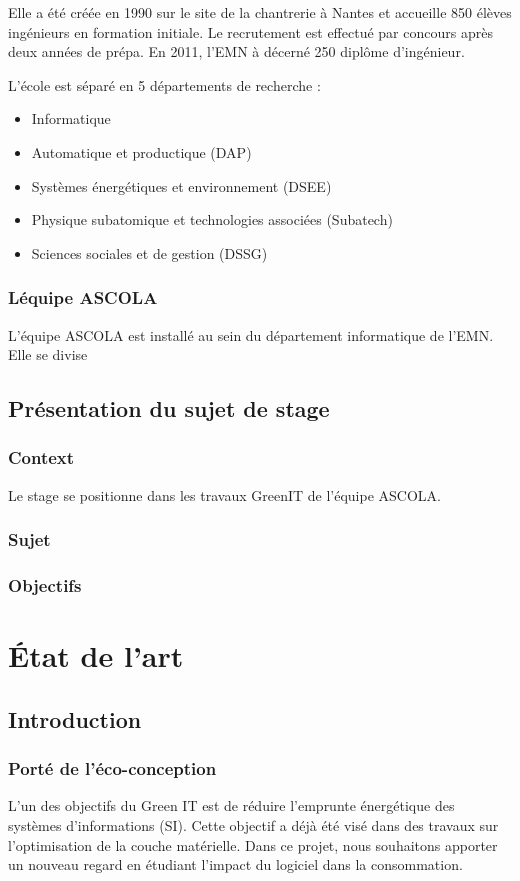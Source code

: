 \documentclass[a4paper, 11pt]{report}
\begin{document}
Elle a été créée en 1990 sur le site de la chantrerie à Nantes et accueille 850 élèves ingénieurs en formation initiale. Le recrutement est effectué par concours après deux années de prépa. En 2011, l’EMN à décerné 250 diplôme d’ingénieur.

L’école est séparé en 5 départements de recherche :
\begin{itemize}
	\item Informatique
	\item Automatique et productique (DAP)
	\item Systèmes énergétiques et environnement (DSEE)
	\item Physique subatomique et technologies associées (Subatech)
	\item Sciences sociales et de gestion (DSSG)
\end{itemize}

\subsection{Léquipe ASCOLA}
L’équipe ASCOLA est installé au sein du département informatique de l’EMN. Elle se divise 
\section{Présentation du sujet de stage}
\subsection{Context}
Le stage se positionne dans les travaux GreenIT de l’équipe ASCOLA.
\subsection{Sujet}

\subsection{Objectifs}

\chapter{État de l'art}
\section{Introduction}
\subsection{Porté de l'éco-conception}
L’un des objectifs du Green IT est de réduire l’emprunte énergétique des systèmes d’informations (SI). Cette objectif a déjà été visé dans des travaux sur l'optimisation de la couche matérielle. Dans ce projet, nous souhaitons apporter un nouveau regard en étudiant l’impact du logiciel dans la consommation.
\end{document}
